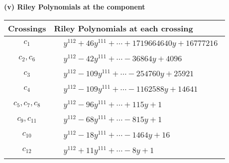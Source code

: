 \documentclass[1p]{elsarticle_modified}
\theoremstyle{definition}
\begin{document}
\newpage\renewcommand{\arraystretch}{1}
\flushleft \textbf{(v) Riley Polynomials at the component}\newline \\
\begin{tabular}{m{50pt}|m{274pt}}
Crossings & \hspace{64pt}Riley Polynomials at each crossing \\
\hline $$\begin{aligned}c_{1}\end{aligned}$$&$\begin{aligned}
&y^{112}+46 y^{111}+\cdots+1719664640 y+16777216
\end{aligned}$\\
\hline $$\begin{aligned}c_{2},c_{6}\end{aligned}$$&$\begin{aligned}
&y^{112}-42 y^{111}+\cdots-36864 y+4096
\end{aligned}$\\
\hline $$\begin{aligned}c_{3}\end{aligned}$$&$\begin{aligned}
&y^{112}-109 y^{111}+\cdots-254760 y+25921
\end{aligned}$\\
\hline $$\begin{aligned}c_{4}\end{aligned}$$&$\begin{aligned}
&y^{112}-109 y^{111}+\cdots-1162588 y+14641
\end{aligned}$\\
\hline $$\begin{aligned}c_{5},c_{7},c_{8}\end{aligned}$$&$\begin{aligned}
&y^{112}-96 y^{111}+\cdots+115 y+1
\end{aligned}$\\
\hline $$\begin{aligned}c_{9},c_{11}\end{aligned}$$&$\begin{aligned}
&y^{112}-68 y^{111}+\cdots-815 y+1
\end{aligned}$\\
\hline $$\begin{aligned}c_{10}\end{aligned}$$&$\begin{aligned}
&y^{112}-18 y^{111}+\cdots-1464 y+16
\end{aligned}$\\
\hline $$\begin{aligned}c_{12}\end{aligned}$$&$\begin{aligned}
&y^{112}+11 y^{111}+\cdots-8 y+1
\end{aligned}$\\
\hline
\end{tabular}\\~\\
\end{document}
